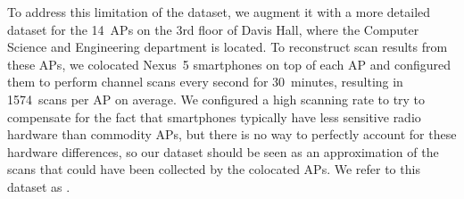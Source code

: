 To address this limitation of the \ubap{} dataset, we augment it with a more
detailed dataset for the 14~APs on the 3rd floor of Davis Hall, where the
Computer Science and Engineering department is located. To reconstruct scan
results from these APs, we colocated Nexus~5 smartphones on top of each AP
and configured them to perform channel scans every second for 30~minutes,
resulting in \num{1574}~scans per AP on average. We configured a high
scanning rate to try to compensate for the fact that smartphones typically
have less sensitive radio hardware than commodity APs, but there is no way to
perfectly account for these hardware differences, so our dataset should be
seen as an approximation of the scans that could have been collected by the
colocated APs. We refer to this dataset as \textbf{\ubapdetail{}}.
